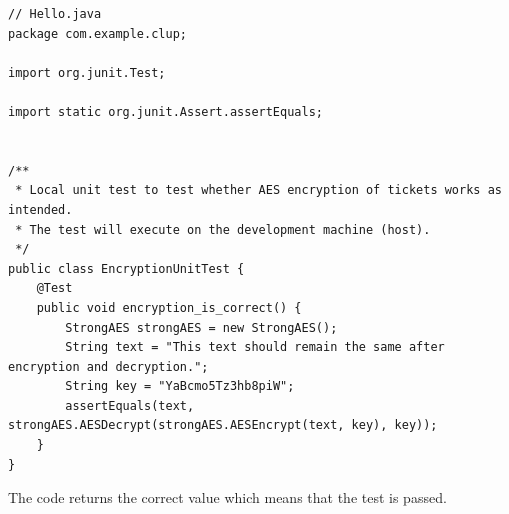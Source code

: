 \begin{lstlisting}
// Hello.java
package com.example.clup;

import org.junit.Test;

import static org.junit.Assert.assertEquals;


/**
 * Local unit test to test whether AES encryption of tickets works as intended.
 * The test will execute on the development machine (host).
 */
public class EncryptionUnitTest {
    @Test
    public void encryption_is_correct() {
        StrongAES strongAES = new StrongAES();
        String text = "This text should remain the same after encryption and decryption.";
        String key = "YaBcmo5Tz3hb8piW";
        assertEquals(text, strongAES.AESDecrypt(strongAES.AESEncrypt(text, key), key));
    }
}

\end{lstlisting}

The code returns the correct value which means that the test is passed.

